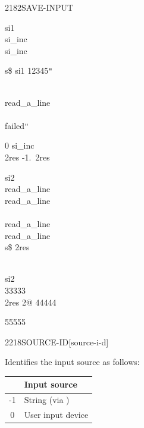 \begin{worddef}{2182}{SAVE-INPUT}
\begin{testing}
		\word{:} si1 \\
		\tab si\_inc   \word{+!} \\
		 si\_inc \word{!} \\
		\word{;}

		\word{:} s\$   si1  12345\texttt{"} \word{;}


		 \\
		\word{:} read\_a\_line \\
		\tab {}  \\
		\tab {}  failed\texttt{"} \\
		\word{;}

		0 si\_inc \word{!} \\
		 2res -1.\ 2res 

		\word{:} si2 \\
		\tab read\_a\_line \\
		\tab read\_a\_line \\
		\tab {} \\
		\tab read\_a\_line \\
		\tab read\_a\_line \\
		\tab s\$  2res  \\
		\tab {} \\
		\word{;}


		si2 \\
		33333 \tab[7.75]   \\
		2res 2@ 44444 \tab[3]  

		55555

	\end{testing}
\end{worddef}


\begin{worddef}{2218}{SOURCE-ID}[source-i-d]
\item {}

	Identifies the input source as follows:

	\begin{center}
		\begin{tabular}{cl}
		\hline\hline
		\word{SOURCE-ID} & Input source \\
		\hline
		-1	& String (via \word{EVALUATE}) \\
		 0	& User input device \\
		\hline\hline
		\end{tabular}
	\end{center}

\end{worddef}


